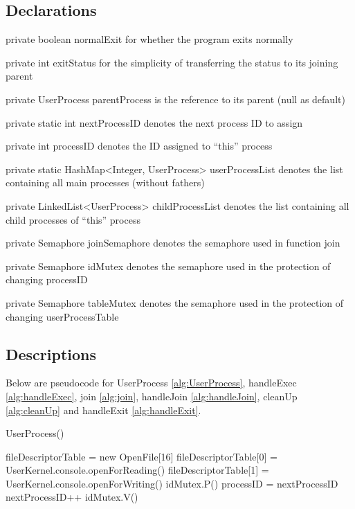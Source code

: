\documentclass{article}
\begin{document}
\begin{spacing}{1.1}
\subsection{Declarations}
\textsf{private boolean normalExit} for whether the program exits normally

\textsf{private int exitStatus} for the simplicity of transferring the status to its joining parent

\textsf{private UserProcess parentProcess} is the reference to its parent (\textsf{null} as default)

\textsf{private static int nextProcessID} denotes the next process ID to assign

\textsf{private int processID} denotes the ID assigned to ``this'' process

\textsf{private static HashMap<Integer, UserProcess> userProcessList} denotes the list containing all main processes (without fathers)

\textsf{private LinkedList<UserProcess> childProcessList} denotes the list containing all child processes of ``this'' process

\textsf{private Semaphore joinSemaphore} denotes the semaphore used in function \textsf{join}

\textsf{private Semaphore idMutex} denotes the semaphore used in the protection of changing \textsf{processID}

\textsf{private Semaphore tableMutex} denotes the semaphore used in the protection of changing \textsf{userProcessTable}
\subsection{Descriptions}
Below are pseudocode for \textsf{UserProcess} \ref{alg:UserProcess}, \textsf{handleExec} \ref{alg:handleExec}, \textsf{join} \ref{alg:join}, \textsf{handleJoin} \ref{alg:handleJoin}, \textsf{cleanUp} \ref{alg:cleanUp} and \textsf{handleExit} \ref{alg:handleExit}.

\begin{algorithm}
  \label{alg:UserProcess}
  \caption{\textsf{UserProcess}()}
  fileDescriptorTable = new OpenFile[16]\;
  fileDescriptorTable[0] = UserKernel.console.openForReading()\;
  fileDescriptorTable[1] = UserKernel.console.openForWriting()\;
  \colorbox{myyellow}{idMutex.P()}\;
  processID = nextProcessID\;
  nextProcessID++\;
  \colorbox{myyellow}{idMutex.V()}\;
\end{algorithm}


\end{spacing}
\end{document}
